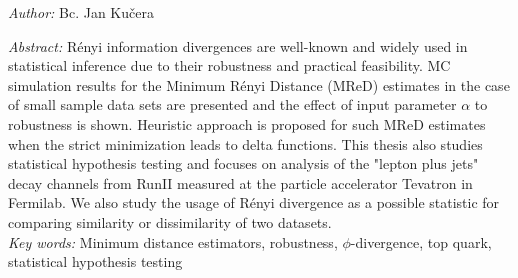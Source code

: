 {\textit{Author:} Bc. Jan Kučera\\
\begin{samepage}
\textit{Abstract:} 
Rényi information divergences are well-known and widely used in statistical inference due to their robustness and practical feasibility. MC simulation results for the Minimum
Rényi Distance (MReD) estimates in the case of small sample data sets are presented and the
effect of input parameter $\alpha$ to robustness is shown. Heuristic approach is proposed for such MReD estimates when the strict minimization leads to delta functions. This thesis also studies statistical hypothesis testing and focuses on analysis of the "lepton plus jets" decay channels from RunII measured at the particle accelerator Tevatron in Fermilab. We also study the usage of Rényi divergence as a possible statistic for comparing similarity or dissimilarity of two datasets.
 \\

{\textit{Key words:}  Minimum distance estimators, robustness, $\phi$-divergence, top quark, statistical hypothesis testing}

\end{samepage}}
